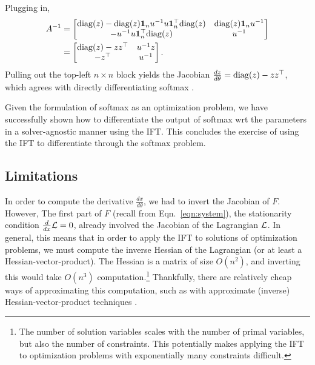 \documentclass[11pt]{article}
\begin{document}
Plugging in,
\begin{equation}
\begin{aligned}
A^{-1} 
&= \begin{bmatrix}
\mathrm{diag}(z) - \mathrm{diag}(z)\mathbf{1}_nu^{-1}u\mathbf{1}^\top_n\mathrm{diag}(z)
    & \mathrm{diag}(z)\mathbf{1}_nu^{-1}\\
-u^{-1}u\mathbf{1}^\top_n \mathrm{diag}(z) & u^{-1}
\end{bmatrix}\\
&= \begin{bmatrix}
\mathrm{diag}(z) - zz^\top
    & u^{-1}z\\
    -z^\top & u^{-1}
\end{bmatrix}.
\end{aligned}
\end{equation}
Pulling out the top-left $n\times n$ block yields
the Jacobian $\frac{d z}{d\theta} = \mathrm{diag}(z) - zz^\top$,
which agrees with directly differentiating softmax \citep{sparsemax}.

Given the formulation of softmax as an optimization problem, we have
successfully shown how to differentiate
the output of softmax wrt the parameters in a solver-agnostic manner using the IFT.
This concludes the exercise of using the IFT to differentiate through the
softmax problem.


\subsection{Limitations}
\label{sec:limitations}
In order to compute the derivative $\frac{dx}{d\theta}$, we had to invert the Jacobian of $F$.
However, The first part of $F$ (recall from Eqn.~\ref{eqn:system}), the stationarity condition
$\frac{d}{dx}\mathcal{L} = 0$,
already involved the Jacobian of the Lagrangian $\mathcal{L}$.
In general, this means that in order to apply the IFT to solutions of optimization problems,
we must compute the inverse Hessian of the Lagrangian (or at least a Hessian-vector-product).
The Hessian is a matrix of size $O(n^2)$,
and inverting this would take $O(n^3)$ computation.\footnote{
The number of solution variables scales with the number of primal variables,
but also the number of constraints.
This potentially makes applying the IFT to optimization problems with exponentially
many constraints difficult.
}
Thankfully, there are relatively cheap ways of approximating this computation,
such as with approximate (inverse) Hessian-vector-product techniques
\citep{rajeswaran2019imaml,lorraine2019hoift}.
\end{document}
